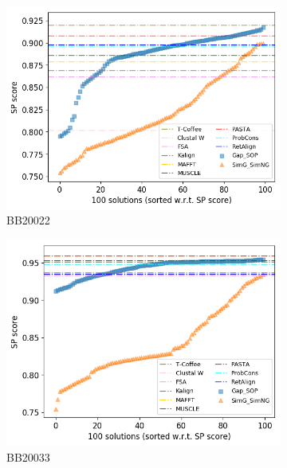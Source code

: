 \begin{figure}[!htbp]
\begin{adjustwidth}{-1cm}{-1cm}
		\begin{subfigure}{0.22\textwidth}
			\includegraphics[width=\columnwidth]{Figure/summary/precomputedInit/Balibase/BB20022_pairs_density_single_run_2}
			\caption{BB20022}
		\end{subfigure}
		\begin{subfigure}{0.22\textwidth}
			\includegraphics[width=\columnwidth]{Figure/summary/precomputedInit/Balibase/BB20033_pairs_density_single_run_2}
			\caption{BB20033}
		\end{subfigure}
		\begin{subfigure}{0.22\textwidth}

\end{subfigure}
\end{adjustwidth}
\end{figure}

